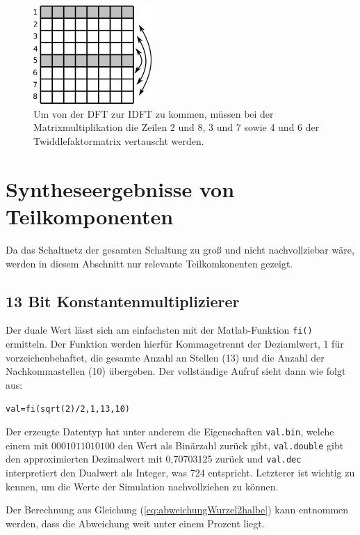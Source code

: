 \begin{figure}[ht]
 \centering
 \includegraphics[width=0.4\textwidth]{img/IDFT_Zeilentausch.png}
 \caption{Um von der DFT zur IDFT zu kommen, müssen bei der Matrixmultiplikation die Zeilen 2 und 8, 3 und 7 sowie 4 und 6 der Twiddlefaktormatrix vertauscht werden.}
 \label{pic:IDFT_Zeilentausch}
\end{figure}




\section{Syntheseergebnisse von Teilkomponenten}\label{sec:Syntheseergebnisse}
Da das Schaltnetz der gesamten Schaltung zu groß und nicht nachvollziebar wäre, werden in diesem Abschnitt nur relevante Teilkomkonenten gezeigt.

\subsection{13 Bit Konstantenmultiplizierer}\label{sec:Konstantenmultiplizierer}

Der duale Wert lässt sich am einfachsten mit der Matlab-Funktion \texttt{fi()} ermitteln. Der Funktion werden hierfür Kommagetrennt der Deziamlwert, 1 für vorzeichenbehaftet,
die gesamte Anzahl an Stellen (13) und die Anzahl der Nachkommastellen (10) übergeben. Der vollständige Aufruf sieht dann wie folgt aus:

\texttt{val=fi(sqrt(2)/2,1,13,10)}

Der erzeugte Datentyp hat unter anderem die Eigenschaften \texttt{val.bin}, welche einem mit $0001011010100$ den Wert als Binärzahl zurück gibt, 
\texttt{val.double} gibt den approximierten Dezimalwert mit 0,70703125 zurück und \texttt{val.dec} interpretiert den Dualwert als Integer, was 724 entspricht.
Letzterer ist wichtig zu kennen, um die Werte der Simulation nachvollziehen zu können.

Der Berechnung aus Gleichung (\ref{eq:abweichungWurzel2halbe}) kann entnommen werden, dass die Abweichung weit unter einem Prozent liegt.


